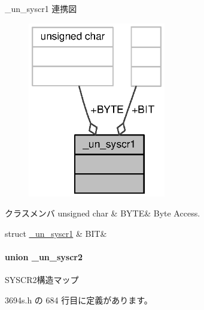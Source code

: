 \+\_\+un\+\_\+syscr1 連携図
\nopagebreak
\begin{figure}[H]
\begin{center}
\leavevmode
\includegraphics[width=170pt]{d2/d9c/union__un__syscr1__coll__graph}
\end{center}
\end{figure}
\begin{DoxyFields}{クラスメンバ}
unsigned char\label{3694s_8h_ac15b1a21315c8fe5fc6ed603e61c8964}
&
B\+Y\+T\+E&
Byte Access. \\
\hline

struct \hyperlink{3694s_8h_d1/df7/struct__un__syscr1_8BIT}{\+\_\+un\+\_\+syscr1}\label{3694s_8h_a33324e99a70e190132ddee4afc008adf}
&
B\+I\+T&
\\
\hline

\end{DoxyFields}
\label{union__un__syscr2}
\paragraph{union \+\_\+un\+\_\+syscr2}
S\+Y\+S\+C\+R2構造マップ 

 3694s.\+h の 684 行目に定義があります。



